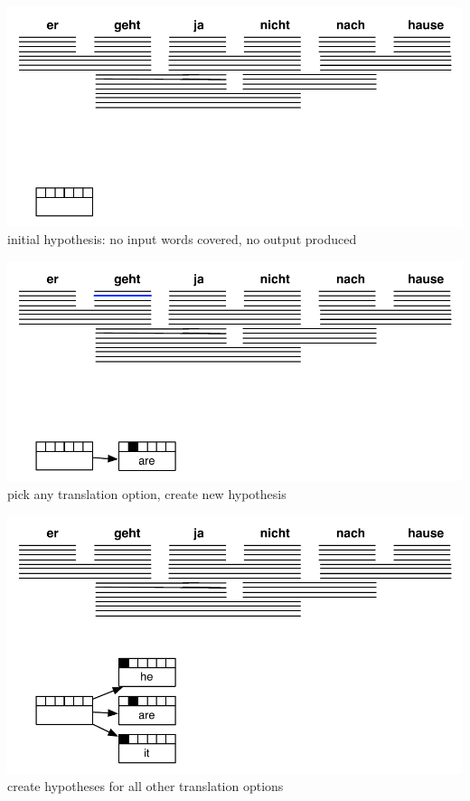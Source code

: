 \documentclass[landscape]{slides}
\begin{document}
\begin{center} 
\includegraphics[scale=1.3]{decoding-step2.pdf}\\[22mm]
initial hypothesis: no input words covered, no output produced
\end{center}


\begin{center}
\includegraphics[scale=1.3]{decoding-step3.pdf}\\[22mm]
pick any translation option, create new hypothesis
\end{center} 


\begin{center} 
\includegraphics[scale=1.3]{decoding-step4.pdf}\\[5mm]
create hypotheses for all other translation options
\end{center}
\end{document}
